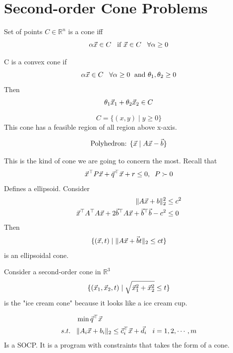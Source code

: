 \section{Second-order Cone Problems} %
\label{sec:second_order_cone_problems}

\begin{definition}[cone]
	Set of points $C\in \mathbb{R}^n$ is a cone iff
	\[
\alpha\vec{x}\in C\;\;\;\text{if }\vec{x}\in C\;\;\;\forall \alpha\ge0
	\]
\end{definition}

\begin{definition}
	C is a convex cone if
	\[
\alpha\vec{x}\in C \;\;\;\forall \alpha\ge0 \;\text{ and } \theta_1,\theta_2\ge 0
	\]
	Then 
	\[
\theta_1\vec{x}_1+\theta_2\vec{x}_2 \in C
	\]
\end{definition}

\begin{example}
	\[C = \{(x, y)\;|\;y\ge 0\}\]
	This cone has a feasible region of all region above x-axis.
\end{example}

\begin{definition}
	\[
\text{Polyhedron: }\{\vec{x}\;|\; A\vec{x}-\vec{b} \}
	\]
\end{definition}

\begin{definition}
	This is the kind of cone we are going to concern the most. Recall that
	\[
\vec{x}^\top P\vec{x}+\vec{q}^\top \vec{x}+r\le 0,\;\;P\succ0
	\]
	Defines a ellipsoid. Consider
	\begin{align*}
		\|A\vec{x}+b\|_2^2 &\le c^2 \\
		\vec{x}^\top A^\top A\vec{x}+2\vec{b}^\top A\vec{x}+\vec{b}^\top\vec{b}-c^2&\le 0
	\end{align*}
	Then \[
\{(\vec{x}, t)\;|\;\|A\vec{x}+\vec{b}t\|_2\le ct\}
	\] is an ellipsoidal cone.
\end{definition}

\begin{remark}
	Consider a second-order cone in $\mathbb{R}^3$
	\[
\{(\vec{x}_1,\vec{x}_2,t)\;|\;\sqrt{\vec{x}_1^2+\vec{x}_2^2}\le t\}
	\]
	is the "ice cream cone" because it looks like a ice cream cup.
\end{remark}

\begin{definition}[SOCP]
\begin{align*}
	&\min \vec{q}^\top\vec{x}\\
	s.t.\;\;\;&\|A_i\vec{x}+b_i\|_2\le \vec{c}_i^\top\vec{x}+\vec{d}_i \;\;\;i=1,2,\cdots,m
\end{align*}
Is a SOCP. It is a program with constraints that takes the form of a cone.
\end{definition}

